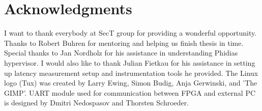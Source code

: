 \chapter*{Acknowledgments}
I want to thank everybody at SecT group for providing a wonderful opportunity.
Thanks to Robert Buhren for mentoring and helping us finish thesis in time.
Special thanks to Jan Nordholz for his assistance in understanding Phidias hypervisor.
I would also like to thank Julian Fietkau for his assistance in setting up latency measurement setup and instrumentation tools he provided.
The Linux logo (Tux) was created by Larry Ewing, Simon Budig, Anja Gerwinski, and ’The GIMP’.
UART module used for communication between FPGA and external PC is designed by Dmitri Nedospasov and Thorsten Schroeder.
